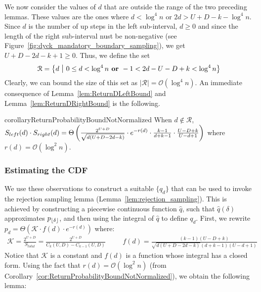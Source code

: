 We now consider the values of $d$ that are outside the range of the two preceding lemmas.
These values are the ones where $d < \log^4 n$ or $2d > U+D-k-\log^4 n$.
Since $d$ is the number of up steps in the left sub-interval, $d \ge 0$
and since the length of the right sub-interval nust be non-negative (see Figure~\ref{fig:dyck_mandatory_boundary_sampling}), we get $U+D-2d-k+1 \ge 0$.
Thus, we define the set
\begin{align}
\label{eq:SetDefinition}
    \mathcal R = \left\{ d\ \mathlarger|\ 0\le d < \log^4 n \textrm{\textbf{\ or\ }} -1 < 2d-U-D+k < \log^4 n \right\}
\end{align}
Clearly, we can bound the size of this set as $|\mathcal R| = \mathcal O(\log^4 n)$.
An immediate consequence of Lemma~\ref{lem:ReturnDLeftBound} and Lemma~\ref{lem:ReturnDRightBound} is the following.

\begin{restatable}{corollary}{ReturnProbabilityBoundNotNormalized}
\label{cor:ReturnProbabilityBoundNotNormalized}
When $d\not \in \mathcal R$,
$S_{left}(d)\cdot S_{right}(d)
= \Theta\left( \frac{2^{U+D}}{\sqrt{d(U+D-2d-k)}}\cdot \mathlarger e^{-r(d)} \cdot \frac{k-1}{d+k-1}\cdot\frac{U-D+k}{U-d+1}\right)$
where $r(d)=\mathcal O(\log^2 n)$.
\end{restatable}



\subsubsection{Estimating the CDF}
\label{sec:estimating_the_cdf}
We use these observations to construct a suitable $\{q_d\}$ that can be used to invoke the rejection sampling lemma (Lemma~\ref{lem:rejection_sampling}).
This is achieved by constructing a piecewise continuous function $\hat q$, such that $\hat q(\delta)$ approximates $p_{\lfloor\delta\rfloor}$,
and then using the integral of $\hat q$ to define $q_d$.
First, we rewrite $p_d = \Theta\left(\mathcal K \cdot f(d)\cdot e^{-r(d)}\right)$ where:
{\small
    \begin{align}
    \label{eq:dyck_integrable_function}
        \mathcal K = \frac{2^{U+D}}{S_{total}} = \frac{2^{U+D}}{C_k(U,D)-C_{k-1}(U,D)}\ \ \ \
        &&f(d) = \frac{(k-1)(U-D+k)}{\sqrt{d(U+D-2d-k)}(d+k-1)(U-d+1)}
    \end{align}}
Notice that $\mathcal K$ is a constant and $f(d)$ is a function whose integral has a closed form.
Using the fact that $r(d) = \mathcal O(\log^2 n)$ (from Corollary~\ref{cor:ReturnProbabilityBoundNotNormalized}), we obtain the following lemma:


